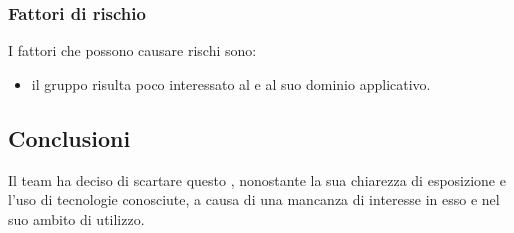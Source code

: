 		\subsubsection {Fattori di rischio}
		I fattori che possono causare rischi sono:
			\begin {itemize}
				\item il gruppo risulta poco interessato al  e al suo dominio applicativo.
			\end {itemize}
	\subsection {Conclusioni}
	Il team ha deciso di scartare questo , nonostante la sua chiarezza di esposizione e l'uso di tecnologie conosciute, a causa di una mancanza di interesse in esso e nel suo ambito di utilizzo.